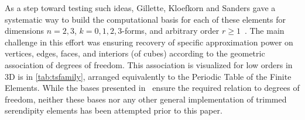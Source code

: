 \documentclass[format=acmsmall,screen,timestamp=false,a4paper]{acmart}
\newcommand\josh[1]{\textbf{\textcolor[rgb]{0,.5,1}{[Josh: #1]}}}
\begin{document}
  

  

	As a step toward testing such ideas, Gillette, Kloefkorn and Sanders gave a systematic way to build the computational basis for each of these elements for dimensions $n = 2, 3$, $k=0, 1, 2, 3$-forms, and arbitrary order $r \geq 1$~\cite{gillette2019computational}.
	The main challenge in this effort was ensuring recovery of specific approximation power on vertices, edges, faces, and interiors (of cubes) according to the geometric association of degrees of freedom.  
	This association is visualized for low orders in 3D is in \cref{tab:tsfamily}, arranged equivalently to the Periodic Table of the Finite Elements.
	While the bases presented in~\cite{gillette2019computational} ensure the required relation to degrees of freedom, neither these bases nor any other general implementation of trimmed serendipity elements has been attempted prior to this paper.

	
	
  
\end{document}

